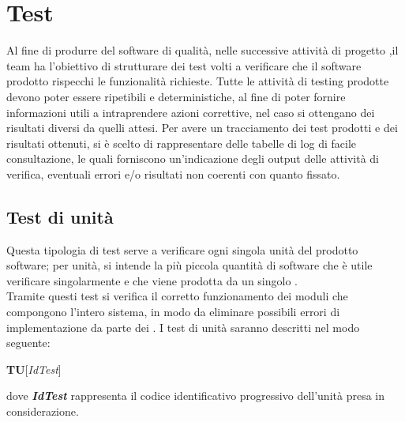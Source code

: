 \newpage
\section{Test}
Al fine di produrre del software di qualità, nelle successive attività di progetto ,il team ha l'obiettivo di strutturare dei test volti a verificare che il software prodotto rispecchi le funzionalità richieste.
Tutte le attività di testing prodotte devono poter essere ripetibili e deterministiche, al fine di poter fornire informazioni utili a intraprendere azioni correttive, nel caso si ottengano dei risultati diversi da quelli attesi.
Per avere un tracciamento dei test prodotti e dei risultati ottenuti, si è scelto di rappresentare delle tabelle di log di facile consultazione, le quali forniscono un'indicazione degli output delle attività di verifica, eventuali errori e/o risultati non coerenti con quanto fissato.

	\subsection{Test di unità}
	Questa tipologia di test serve a verificare ogni singola unità del prodotto software; per unità, si intende la più piccola quantità di software che è utile verificare singolarmente e che viene prodotta da un singolo \textit{\Progr}.\\
	Tramite questi test si verifica il corretto funzionamento dei moduli che compongono l'intero sistema, in modo da eliminare possibili errori di implementazione da parte dei \textit{\Progrs}.
	I test di unità saranno descritti nel modo seguente:
	\begin{center}
		\textbf{TU}[\textit{IdTest}]
	\end{center}
	\begin{center}
		dove \textbf{\textit{IdTest}} rappresenta il codice identificativo progressivo dell'unità presa in considerazione.
	\end{center}
	
